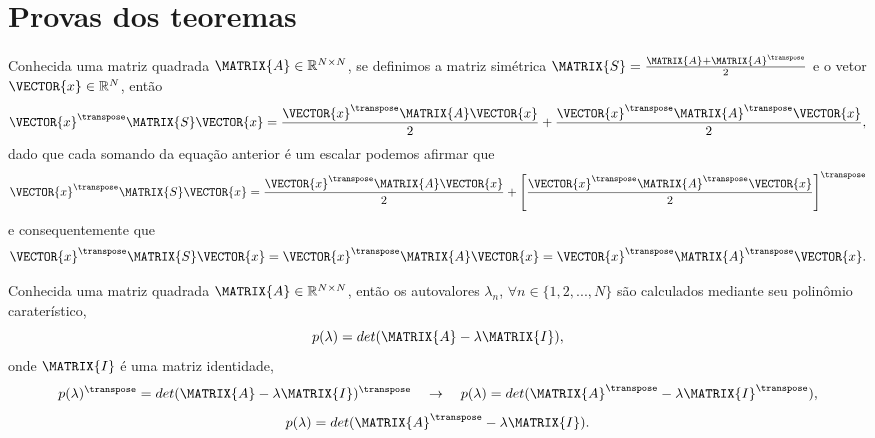\section{Provas dos teoremas}

\begin{myproofT}\label{proof:theo:simetricmatrix0}
Conhecida uma matriz quadrada $\MATRIX{A} \in \mathbb{R}^{N \times N}$,
se definimos a matriz simétrica $\MATRIX{S}=\frac{\MATRIX{A}+\MATRIX{A}^{\transpose}}{2}$ e
o vetor $\VECTOR{x} \in \mathbb{R}^{N}$, então
\begin{equation}
\VECTOR{x}^{\transpose}\MATRIX{S}\VECTOR{x} = 
\frac{\VECTOR{x}^{\transpose}\MATRIX{A}\VECTOR{x}}{2} +
\frac{\VECTOR{x}^{\transpose}\MATRIX{A}^{\transpose}\VECTOR{x}}{2},
\end{equation}
dado que cada somando da equação anterior é um escalar podemos afirmar que 
\begin{equation}
\VECTOR{x}^{\transpose}\MATRIX{S}\VECTOR{x} = 
\frac{\VECTOR{x}^{\transpose}\MATRIX{A}\VECTOR{x}}{2} +
\left[\frac{\VECTOR{x}^{\transpose}\MATRIX{A}^{\transpose}\VECTOR{x}}{2}\right]^{\transpose}
\end{equation}
e consequentemente que
\begin{equation}
\VECTOR{x}^{\transpose}\MATRIX{S}\VECTOR{x} = 
\VECTOR{x}^{\transpose}\MATRIX{A}\VECTOR{x} =
\VECTOR{x}^{\transpose}\MATRIX{A}^{\transpose}\VECTOR{x}.
\end{equation} 
\end{myproofT}

\begin{myproofT}\label{proof:theo:matrixgeneric3}
Conhecida uma matriz quadrada $\MATRIX{A} \in \mathbb{R}^{N \times N}$, 
então os  autovalores $\lambda_n$, $\forall n \in \{1, 2, ..., N\}$ são calculados mediante 
seu polinômio caraterístico,
\begin{equation}
p(\lambda)=det(\MATRIX{A}-\lambda \MATRIX{I}),
\end{equation}
onde $\MATRIX{I}$ é uma matriz identidade,
\begin{equation}
p(\lambda)^{\transpose}=det(\MATRIX{A}-\lambda \MATRIX{I})^{\transpose}
\quad \rightarrow \quad
p(\lambda)=det(\MATRIX{A}^{\transpose}-\lambda \MATRIX{I}^{\transpose}),
\end{equation}
\begin{equation}
p(\lambda)=det(\MATRIX{A}^{\transpose}-\lambda \MATRIX{I}).
\end{equation}
\end{myproofT}


